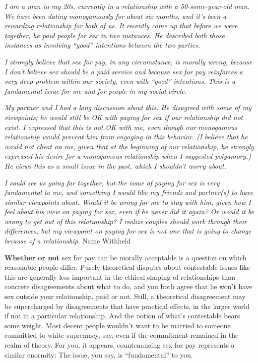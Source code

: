 \emph{I am a man in my 20s, currently in a relationship with a
50-some-year-old man. We have been dating monogamously for about six
months, and it's been a rewarding relationship for both of us. It
recently came up that before we were together, he paid people for sex in
two instances. He described both those instances as involving ``good''
intentions between the two parties.}

\emph{I strongly believe that sex for pay, in any circumstance, is
morally wrong, because I don't believe sex should be a paid service and
because sex for pay reinforces a very deep problem within our society,
even with ``good'' intentions. This is a fundamental issue for me and
for people in my social circle.}

\emph{My partner and I had a long discussion about this. He disagreed
with some of my viewpoints; he would still be OK with paying for sex if
our relationship did not exist. I expressed that this is not OK with me,
even though our monogamous relationship would prevent him from engaging
in this behavior. (I believe that he would not cheat on me, given that
at the beginning of our relationship, he strongly expressed his desire
for a monogamous relationship when I suggested polyamory.) He views this
as a small issue in the past, which I shouldn't worry about.}

\emph{I could see us going far together, but the issue of paying for sex
is very fundamental to me, and something I would like my friends and
partner(s) to have similar viewpoints about. Would it be wrong for me to
stay with him, given how I feel about his view on paying for sex, even
if he never did it again? Or would it be wrong to get out of this
relationship? I realize couples should work through their differences,
but my viewpoint on paying for sex is not one that is going to change
because of a relationship}. Name Withheld

\textbf{Whether or not} sex for pay can be morally acceptable is a
question on which reasonable people differ. Purely theoretical disputes
about contestable issues like this are generally less important in the
ethical shaping of relationships than concrete disagreements about what
to do, and you both agree that he won't have sex outside your
relationship, paid or not. Still, a theoretical disagreement may be
supercharged by disagreements that have practical effects, in the larger
world if not in a particular relationship. And the notion of what's
contestable bears some weight. Most decent people wouldn't want to be
married to someone committed to white supremacy, say, even if the
commitment remained in the realm of theory. For you, it appears,
countenancing sex for pay represents a similar enormity: The issue, you
say, is ``fundamental'' to you.

